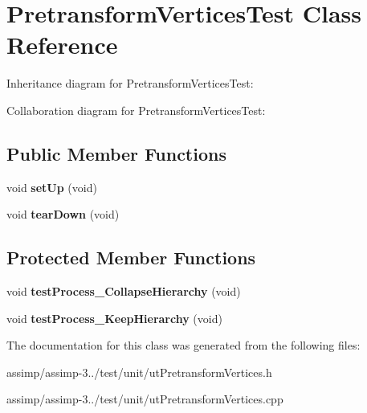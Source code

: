 \hypertarget{class_pretransform_vertices_test}{\section{Pretransform\+Vertices\+Test Class Reference}
\label{class_pretransform_vertices_test}
}


Inheritance diagram for Pretransform\+Vertices\+Test\+:


Collaboration diagram for Pretransform\+Vertices\+Test\+:
\subsection*{Public Member Functions}
\begin{DoxyCompactItemize}
\item 
\hypertarget{class_pretransform_vertices_test_afd66092311cd5abf0ee0a125d07e4dba}{void {\bfseries set\+Up} (void)}\label{class_pretransform_vertices_test_afd66092311cd5abf0ee0a125d07e4dba}

\item 
\hypertarget{class_pretransform_vertices_test_a2672f9bb2da20953d8065962c66067b2}{void {\bfseries tear\+Down} (void)}\label{class_pretransform_vertices_test_a2672f9bb2da20953d8065962c66067b2}

\end{DoxyCompactItemize}
\subsection*{Protected Member Functions}
\begin{DoxyCompactItemize}
\item 
\hypertarget{class_pretransform_vertices_test_afed5b7be0a5edaa98ba28906a24f1d8c}{void {\bfseries test\+Process\+\_\+\+Collapse\+Hierarchy} (void)}\label{class_pretransform_vertices_test_afed5b7be0a5edaa98ba28906a24f1d8c}

\item 
\hypertarget{class_pretransform_vertices_test_a154734f2d94115be80d2d47d637678be}{void {\bfseries test\+Process\+\_\+\+Keep\+Hierarchy} (void)}\label{class_pretransform_vertices_test_a154734f2d94115be80d2d47d637678be}

\end{DoxyCompactItemize}


The documentation for this class was generated from the following files\+:\begin{DoxyCompactItemize}
\item 
assimp/assimp-\/3../test/unit/ut\+Pretransform\+Vertices.\+h\item 
assimp/assimp-\/3../test/unit/ut\+Pretransform\+Vertices.\+cpp\end{DoxyCompactItemize}
